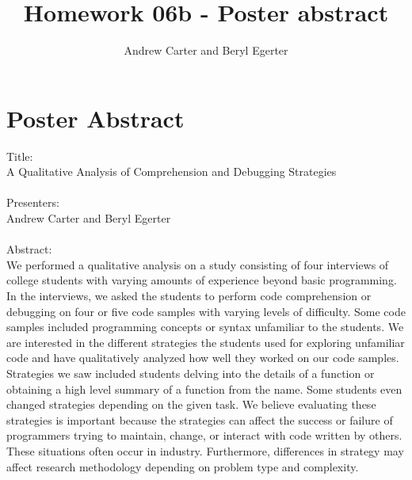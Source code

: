 \documentclass{article}
\title{Homework 06b - Poster abstract}
\author{Andrew Carter and Beryl Egerter}
\begin{document}
\maketitle
\section{Poster Abstract}
Title: \\  A Qualitative Analysis of Comprehension and Debugging Strategies \\ \\
Presenters: \\ Andrew Carter and Beryl Egerter \\ \\
Abstract: \\
We performed a qualitative analysis on a study consisting of four interviews of college students with varying amounts of experience beyond basic programming. In the interviews, we asked the students to perform code comprehension or debugging on four or five code samples with varying levels of difficulty. Some code samples included programming concepts or syntax unfamiliar to the students. We are interested in the different strategies the students used for exploring unfamiliar code and have qualitatively analyzed how well they worked on our code samples. Strategies we saw included students delving into the details of a function or obtaining a high level summary of a function from the name. Some students even changed strategies depending on the given task. We believe evaluating these strategies is important because the strategies can affect the success or failure of programmers trying to maintain, change, or interact with code written by others. These situations often occur in industry. Furthermore, differences in strategy may affect research methodology depending on problem type and complexity.
\end{document}
